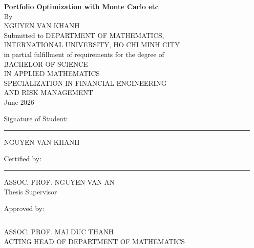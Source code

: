 \documentclass[12pt,a4paper,oneside]{book}
\theoremstyle{definition}
\begin{document}
\begin{titlepage}
		\newpage
		\thispagestyle{empty}	
		\begin{center}
			\large\textbf{Portfolio Optimization with Monte Carlo etc} \\
			\normalsize{By}\\
			\large{NGUYEN VAN KHANH}\\
			\vskip10mm
			\normalsize{Submitted to DEPARTMENT OF MATHEMATICS,\\INTERNATIONAL UNIVERSITY, HO CHI MINH CITY\\ in partial fulfillment of requirements for the degree of\\
				BACHELOR OF SCIENCE \\ 
				IN APPLIED MATHEMATICS \\
				SPECIALIZATION IN FINANCIAL ENGINEERING  \\ 
				AND RISK MANAGEMENT}\\
			June 2026
			\vskip20mm
		\end{center}
        Signature of Student:
        \rule[0em]{26.7em}{0.5pt}
            \begin{flushright}NGUYEN VAN KHANH \end{flushright}
		\vskip10mm
		Certified by: \rule[0em]{30em}{0.5pt}
		\begin{flushright} ASSOC. PROF. NGUYEN VAN AN\\ Thesis Supervisor 
		\end{flushright}
		\vskip10mm
		Approved by:
        \rule[0em]{30em}{0.5pt}
        \begin{flushright} ASSOC. PROF. MAI DUC THANH\\ ACTING HEAD OF DEPARTMENT OF MATHEMATICS
        \end{flushright}
	\end{titlepage}
		
\end{document}
